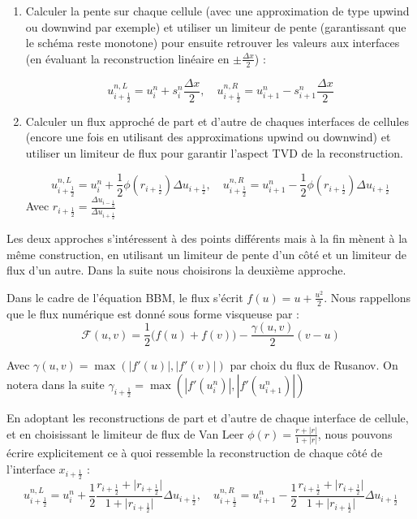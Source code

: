 \vspace{1em}
\begin{enumerate}
    \item Calculer la pente sur chaque cellule (avec une approximation de type upwind ou downwind par exemple) et utiliser un limiteur de pente (garantissant que le schéma reste monotone) pour ensuite retrouver les valeurs aux interfaces (en évaluant la reconstruction linéaire en $\pm \frac{\Delta x}{2}$) :

    $$u_{i + \frac{1}{2}}^{n,L} = u_i^n + s_i^n \frac{\Delta x}{2}, \quad u_{i + \frac{1}{2}}^{n,R} = u_{i+1}^n - s_{i+1}^n \frac{\Delta x}{2}$$
    
    \item Calculer un flux approché de part et d'autre de chaques interfaces de cellules (encore une fois en utilisant des approximations upwind ou downwind) et utiliser un limiteur de flux pour garantir l'aspect TVD de la reconstruction.

    $$u_{i + \frac{1}{2}}^{n,L} = u_i^n + \frac{1}{2} \phi(r_{i+\frac{1}2{}}) \Delta u_{i+\frac{1}{2}}, \quad u_{i + \frac{1}{2}}^{n,R} = u_{i+1}^n - \frac{1}{2} \phi(r_{i+\frac{1}2{}}) \Delta u_{i+\frac{1}{2}}$$
    Avec $r_{i+\frac{1}{2}} = \frac{\Delta u_{i-\frac{1}{2}}}{\Delta u_{i + \frac{1}{2}}}$
    
\end{enumerate}

Les deux approches s'intéressent à des points différents mais à la fin mènent à la même construction, en utilisant un limiteur de pente d'un côté et un limiteur de flux d'un autre.
Dans la suite nous choisirons la deuxième approche.

\vspace{1em}

Dans le cadre de l'équation BBM, le flux s'écrit $f(u) = u + \frac{u^2}{2}$.
Nous rappellons que le flux numérique est donné sous forme visqueuse par :
$$\mathcal{F}(u,v) = \frac{1}{2}\big(f(u) + f(v)\big) - \frac{\gamma(u,v)}{2}(v-u)$$

Avec $\gamma(u,v) = \max(|f'(u)|,|f'(v)|)$ par choix du flux de Rusanov.
On notera dans la suite $\gamma_{i+\frac{1}{2}} = \max(|f'(u_i^n)|,|f'(u_{i+1}^n)|)$

En adoptant les reconstructions de part et d'autre de chaque interface de cellule, et en choisissant le limiteur de flux de Van Leer $\phi(r) = \frac{r + |r|}{1 + |r|}$, nous pouvons écrire explicitement ce à quoi ressemble la reconstruction de chaque côté de l'interface $x_{i+\frac{1}{2}}$ :
$$u_{i + \frac{1}{2}}^{n,L} = u_i^n + \frac{1}{2} \frac{r_{i+\frac{1}{2}} + \big|r_{i+\frac{1}{2}}\big|}{1 + \big|r_{i+\frac{1}{2}}\big|} \Delta u_{i+\frac{1}{2}}, \quad u_{i + \frac{1}{2}}^{n,R} = u_{i+1}^n - \frac{1}{2} \frac{r_{i+\frac{1}{2}} + \big|r_{i+\frac{1}{2}}\big|}{1 + \big|r_{i+\frac{1}{2}}\big|} \Delta u_{i+\frac{1}{2}}$$

